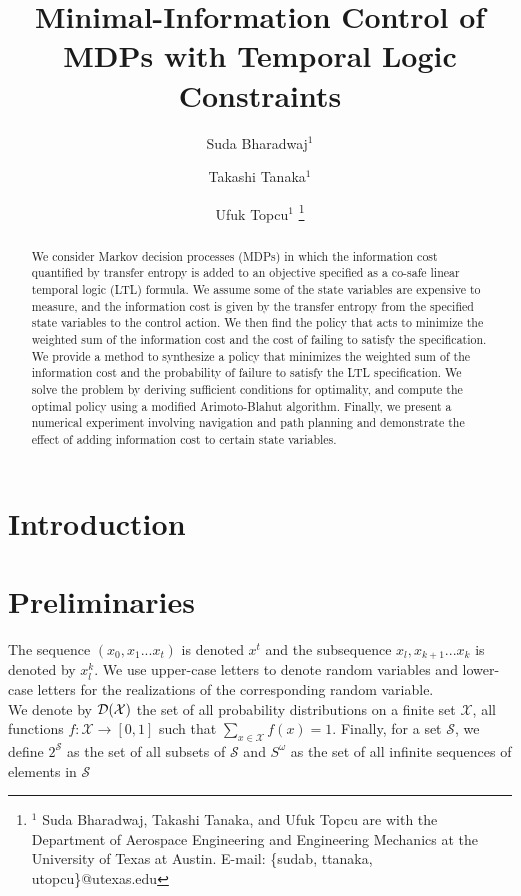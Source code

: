 \documentclass[letterpaper, 10 pt, conference]{ieeeconf}  %
\title{Minimal-Information Control of MDPs with Temporal Logic Constraints
}
\author{Suda Bharadwaj$^{1}$ \and Takashi Tanaka$^{1}$ \and Ufuk Topcu$^{1}$%
\thanks{$^{1}$ Suda Bharadwaj, Takashi Tanaka, and Ufuk Topcu are with the Department of Aerospace Engineering and Engineering Mechanics at the University of Texas at Austin. E-mail: \{sudab, ttanaka, utopcu\}@utexas.edu}%
}
\begin{document}
\maketitle
\thispagestyle{empty}
\pagestyle{empty}


\begin{abstract}
We consider Markov decision processes (MDPs) in which the information cost quantified by transfer entropy is added to an objective specified as a co-safe linear temporal logic (LTL) formula. We assume some of the state variables are expensive to measure, and the information cost is given by the transfer entropy from the specified state variables to the control action. We then find the policy that acts to minimize the weighted sum of the information cost and the cost of failing to satisfy the specification. We provide a method to synthesize a policy that minimizes the weighted sum of the information cost and the probability of failure to satisfy the LTL specification. We solve the problem by deriving sufficient conditions for optimality, and compute the optimal policy using a modified Arimoto-Blahut algorithm. Finally, we present a numerical experiment involving navigation and path planning and demonstrate the effect of adding information cost to certain state variables.
\end{abstract}


\section{Introduction}



\section{Preliminaries}
The sequence $(x_0,x_{1}...x_t)$ is denoted $x^t$ and the subsequence $x_l,x_{k+1}...x_k$ is denoted by $x_{l}^{k}$. We use upper-case letters to denote random variables and lower-case letters for the realizations of the corresponding random variable. \\
We denote by $\mathcal{D}(\mathcal{X})$ the set of all probability distributions on a finite
set $\mathcal{X}$, \ie all functions $f: \mathcal{X} \to [0,1]$ such that $\sum_{x\in \mathcal{X}}f(x)=1$. Finally, for a set $\mathcal{S}$, we define $2^\mathcal{S}$ as the set of all subsets of $\mathcal{S}$ and $S^{\omega}$ as the set of all infinite sequences of elements in $\mathcal{S}$
 
\end{document}
